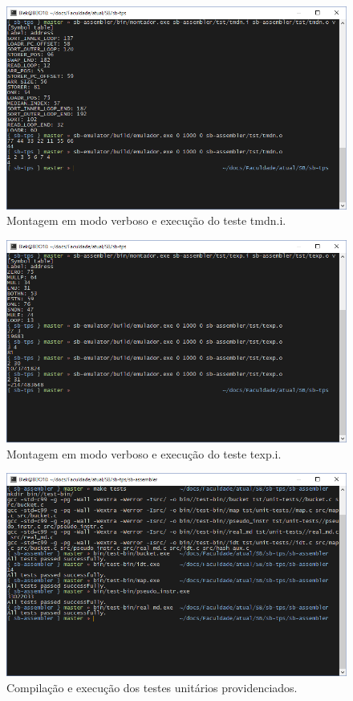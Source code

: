 \documentclass[10pt,a4paper]{article}
\numberwithin{equation}{section}
\begin{document}
\begin{figure}[h]
    \includegraphics[scale=0.7]{imagens/tmdn_console.png}
    \centering
    \caption{Montagem em modo verboso e execução do teste tmdn.i.}
\end{figure}

\begin{figure}[h]
    \includegraphics[scale=0.7]{imagens/texp_console.png}
    \centering
    \caption{Montagem em modo verboso e execução do teste texp.i.}
\end{figure}

\begin{figure}[h]
    \includegraphics[scale=0.7]{imagens/unit_tests_console.png}
    \centering
    \caption{Compilação e execução dos testes unitários providenciados.}
\end{figure}
\end{document}
